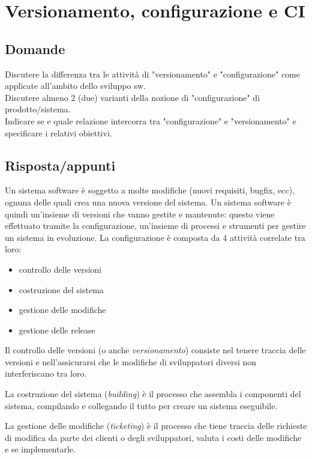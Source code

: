 \section{Versionamento, configurazione e CI} %

\subsection*{Domande}
Discutere la differenza tra le attività di "versionamento" e "configurazione" come applicate all'ambito dello sviluppo sw.\\

Discutere almeno 2 (due) varianti della nozione di "configurazione" di prodotto/sistema. \\

Indicare se e quale relazione intercorra tra "configurazione" e "versionamento" e specificare i relativi obiettivi.

\subsection*{Risposta/appunti}

Un sistema software è soggetto a molte modifiche (nuovi requisiti, bugfix, ecc), ognuna delle quali crea una nuova versione del sistema. Un sistema software è quindi un'insieme di versioni che vanno gestite e mantenute: questo viene effettuato tramite la configurazione, un'insieme di processi e strumenti per gestire un sistema in evoluzione. 
La configurazione è composta da 4 attività correlate tra loro:
\begin{itemize}
\item controllo delle versioni
\item costruzione del sistema
\item gestione delle modifiche
\item gestione delle release 
\end{itemize}

Il controllo delle versioni (o anche \textit{versionamento}) consiste nel tenere traccia delle versioni e nell'assicurarsi che le modifiche di sviluppatori diversi non interferiscano tra loro.

La costruzione del sistema (\textit{building}) è il processo che assembla i componenti del sistema, compilando e collegando il tutto per creare un sistema eseguibile.

La gestione delle modifiche (\textit{ticketing}) è il processo che tiene traccia delle richieste di modifica da parte dei clienti o degli sviluppatori, valuta i costi delle modifiche e se implementarle.


